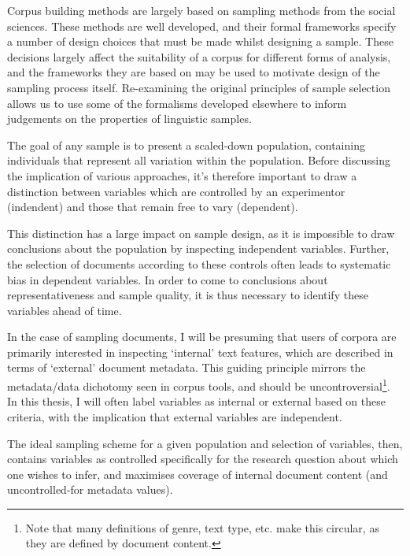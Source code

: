 

Corpus building methods are largely based on sampling methods from the social sciences.  These methods are well developed, and their formal frameworks specify a number of design choices that must be made whilst designing a sample.  
These decisions largely affect the suitability of a corpus for different forms of analysis, and the frameworks they are based on may be used to motivate design of the sampling process itself.
Re-examining the original principles of sample selection allows us to use some of the formalisms developed elsewhere to inform judgements on the properties of linguistic samples.

The goal of any sample is to present a scaled-down population, containing individuals that represent all variation within the population.  Before discussing the implication of various approaches, it's therefore important to draw a distinction between variables which are controlled by an experimentor (indendent) and those that remain free to vary (dependent).

This distinction has a large impact on sample design, as it is impossible to draw conclusions about the population by inspecting independent variables.  Further, the selection of documents according to these controls often leads to systematic bias in dependent variables.  In order to come to conclusions about representativeness and sample quality, it is thus necessary to identify these variables ahead of time.

In the case of sampling documents, I will be presuming that users of corpora are primarily interested in inspecting `internal' text features, which are described in terms of `external' document metadata.  This guiding principle mirrors the metadata/data dichotomy seen in corpus tools, and should be uncontroversial\footnote{Note that many definitions of genre, text type, etc. make this circular, as they are defined by document content.}.  In this thesis, I will often label variables as internal or external based on these criteria, with the implication that external variables are independent.

The ideal sampling scheme for a given population and selection of variables, then, contains variables as controlled specifically for the research question about which one wishes to infer, and maximises coverage of internal document content (and uncontrolled-for metadata values).

